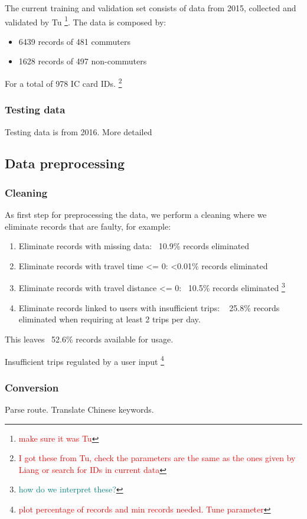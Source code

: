 \documentclass{article}
\newcommand{\selfnote}[1]{\footnote{\textcolor{red}{#1}}}
\newcommand{\domainDoubt}[1]{\footnote{\textcolor{teal}{#1}}}
\begin{document}
The current training and validation set consists of data from 2015, collected and validated by Tu \cite{tu2016impact} \selfnote{make sure it was Tu}. The data is composed by:

\begin{itemize}
\item 6439 records of 481 commuters
\item 1628 records of 497 non-commuters
\end{itemize}

For a total of 978 IC card IDs. \selfnote{I got these from Tu, check the parameters are the same as the ones given by Liang or search for IDs in current data}

\subsubsection{Testing data}
Testing data is from 2016. More detailed

\subsection{Data preprocessing}
\subsubsection{Cleaning}
As first step for preprocessing the data, we perform a cleaning where we eliminate records that are faulty, for example: 

\begin{enumerate}
\item Eliminate records with missing data: ~10.9\% records eliminated
\item Eliminate records with travel time <= 0: <0.01\% records eliminated
\item Eliminate records with travel distance <= 0: ~10.5\% records eliminated \domainDoubt{how do we interpret these?}
\item Eliminate records linked to users with insufficient trips: ~ 25.8\% records eliminated when requiring at least 2 trips per day.
\end{enumerate}

This leaves ~52.6\% records available for usage. 

Insufficient trips regulated by a user input \selfnote{plot percentage of records and min records needed. Tune parameter}

\subsubsection{Conversion}
Parse route. Translate Chinese keywords. 
\end{document}
